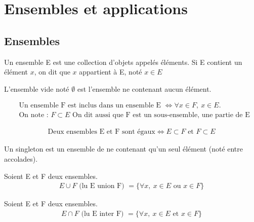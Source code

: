 \chapter{Ensembles et applications}
\section{Ensembles}
\begin{definition}
	Un ensemble E est une collection d'objets appelés éléments.
	Si E contient un élément $x$, on dit que $x$ appartient à E, noté $x \in E$ 
\end{definition}
\begin{definition}
	L'ensemble vide noté $\emptyset$ est l'ensemble ne contenant aucun élément.
\end{definition}
\begin{definition}[Inclusion]
	\begin{align*}
		&\text{Un ensemble F est inclus dans un ensemble E } \iff \forall x \in F,\ x \in E. \\
		&\text{On note : } F \subset E \text{ On dit aussi que F est un sous-ensemble, une partie de E}
	\end{align*}
\end{definition}
\begin{definition}
	\begin{align*}
		\text{Deux ensembles E et F sont égaux} \iff E \subset F \text{ et } F \subset E
	\end{align*} 
\end{definition}
\begin{definition}[Singleton]
	Un singleton est un ensemble de ne contenant qu'un seul élément (noté entre accolades).
\end{definition}
\begin{definition}
	Soient E et F deux ensembles.
	\begin{align*}
		E \cup F \text{ (lu E union F) } = \{\forall x,\ x \in E \text{ ou } x \in F \}
	\end{align*}
\end{definition}
\begin{definition}
	Soient E et F deux ensembles.
	\begin{align*}
		E \cap F \text{ (lu E inter F) } = \{\forall x,\ x \in E \text{ et } x \in F \}
	\end{align*}
\end{definition}

